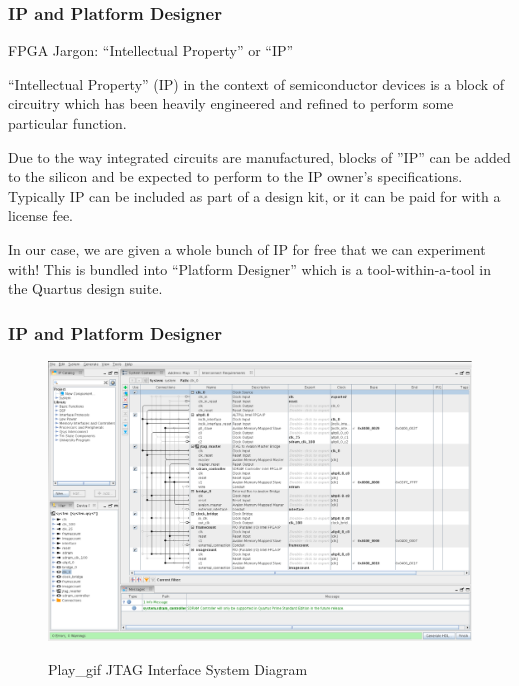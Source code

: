 \documentclass{beamer}
\begin{document}
\begin{frame}
\frametitle{IP and Platform Designer}

FPGA Jargon:  ``Intellectual Property'' or ``IP''

``Intellectual Property'' (IP) in the context of semiconductor devices is a block of circuitry which has been heavily engineered and refined to perform some particular function.

Due to the way integrated circuits are manufactured, blocks of ''IP'' can be added to the silicon and be expected to perform to the IP owner's specifications.  Typically IP can be included as part of a design kit, or it can be paid for with a license fee.

In our case, we are given a whole bunch of IP for free that we can experiment with!  This is bundled into ``Platform Designer'' which is a tool-within-a-tool in the Quartus design suite.

\end{frame}

\begin{frame}
\frametitle{IP and Platform Designer}

\begin{figure}[h]
	\centering
	\includegraphics[width=1.0\textwidth]{graphics/platform_designer.pdf}
	\centering\bfseries
	\caption{Play\_gif JTAG Interface System Diagram}
\end{figure}

\end{frame}
\end{document}
